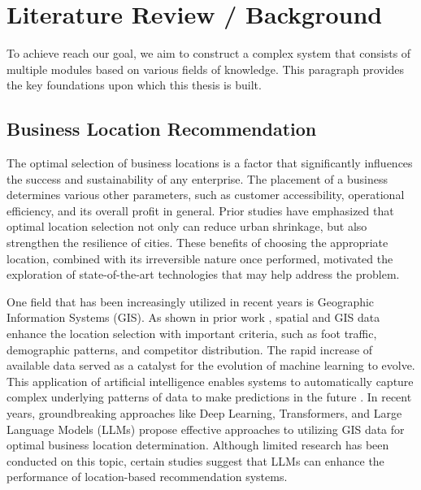 \chapter{Literature Review / Background}
\label{chap2}

To achieve reach our goal, we aim to construct a complex system that consists of multiple modules based on various fields of knowledge. This paragraph provides the key foundations upon which this thesis is built.

\section{Business Location Recommendation}

The optimal selection of business locations is a factor that significantly influences the success and sustainability of any enterprise. The placement of a business determines various other parameters, such as customer accessibility, operational efficiency, and
its overall profit in general. Prior studies \cite{paper_xorotaxias} have emphasized that optimal location selection not only can reduce urban shrinkage, but also strengthen the resilience of cities. These benefits of choosing the appropriate location, combined with its irreversible nature once performed, motivated the exploration of state-of-the-art technologies that may help address the problem. 

One field that has been increasingly utilized in recent years is Geographic Information Systems (GIS). As shown in prior work \cite{restaurant_rec_system}, spatial and GIS data enhance the location selection with important criteria, such as foot traffic, demographic patterns, and competitor distribution. The rapid increase of available data served as a catalyst for the evolution of machine learning to evolve. This application of artificial intelligence enables systems to automatically capture complex underlying patterns of data to make predictions in the future \cite{megacities_paper}. In recent years, groundbreaking approaches like Deep Learning, Transformers, and Large Language Models (LLMs) propose effective approaches to utilizing GIS data for optimal business location determination. Although limited research has been conducted on this topic, certain studies \cite{gpt_chatbots} \cite{llm_recommend_systems} suggest that LLMs can enhance the performance of location-based recommendation systems. 


